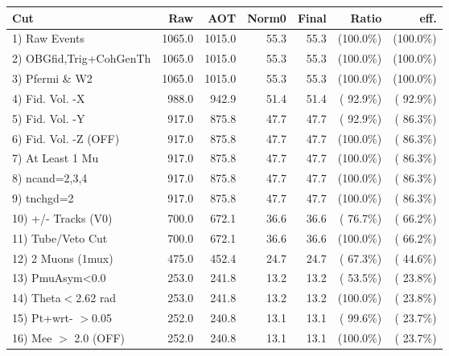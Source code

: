  \begin{table}[h!]\centering
 \begin{tabular}{||l||r|r|r|r|r|r||}
 \hline
 \hline
 Cut & Raw & AOT & Norm0 & Final & Ratio & eff.       \\
 \hline
  1) Raw Events           &       1065.0 &       1015.0 &         55.3 &         55.3 & (100.0\%) & (100.0\%) \\
  2) OBGfid,Trig+CohGenTh &       1065.0 &       1015.0 &         55.3 &         55.3 & (100.0\%) & (100.0\%) \\
  3) Pfermi \& W2         &       1065.0 &       1015.0 &         55.3 &         55.3 & (100.0\%) & (100.0\%) \\
  4) Fid. Vol. -X         &        988.0 &        942.9 &         51.4 &         51.4 & ( 92.9\%) & ( 92.9\%) \\
  5) Fid. Vol. -Y         &        917.0 &        875.8 &         47.7 &         47.7 & ( 92.9\%) & ( 86.3\%) \\
  6) Fid. Vol. -Z (OFF)   &        917.0 &        875.8 &         47.7 &         47.7 & (100.0\%) & ( 86.3\%) \\
  7) At Least 1 Mu        &        917.0 &        875.8 &         47.7 &         47.7 & (100.0\%) & ( 86.3\%) \\
  8) ncand=2,3,4          &        917.0 &        875.8 &         47.7 &         47.7 & (100.0\%) & ( 86.3\%) \\
  9) tnchgd=2             &        917.0 &        875.8 &         47.7 &         47.7 & (100.0\%) & ( 86.3\%) \\
 10) +/- Tracks (V0)      &        700.0 &        672.1 &         36.6 &         36.6 & ( 76.7\%) & ( 66.2\%) \\
 11) Tube/Veto Cut        &        700.0 &        672.1 &         36.6 &         36.6 & (100.0\%) & ( 66.2\%) \\
 12) 2 Muons (1mux)       &        475.0 &        452.4 &         24.7 &         24.7 & ( 67.3\%) & ( 44.6\%) \\
 13) PmuAsym<0.0          &        253.0 &        241.8 &         13.2 &         13.2 & ( 53.5\%) & ( 23.8\%) \\
 14) Theta$<$2.62 rad     &        253.0 &        241.8 &         13.2 &         13.2 & (100.0\%) & ( 23.8\%) \\
 15) Pt+wrt- $>$0.05      &        252.0 &        240.8 &         13.1 &         13.1 & ( 99.6\%) & ( 23.7\%) \\
 16) Mee $>$ 2.0  (OFF)   &        252.0 &        240.8 &         13.1 &         13.1 & (100.0\%) & ( 23.7\%) \\

\end{tabular}
\end{table}
